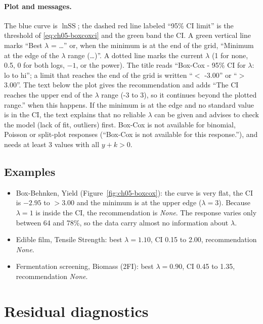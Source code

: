 \paragraph{Plot and messages.} The blue curve is $\ln\text{SS}$; the dashed red line labeled ``95\% CI
limit'' is the threshold of \eqref{eq:ch05-boxcoxci} and the green band the CI. A green vertical line marks
``Best $\lambda$ = \dots'' or, when the minimum is at the end of the grid, ``Minimum at the edge of the
$\lambda$ range (\dots)''. A dotted line marks the current $\lambda$ (1 for none, 0.5, 0 for both logs, $-1$,
or the power). The title reads ``Box-Cox - 95\% CI for $\lambda$: lo to hi''; a limit that reaches the end of
the grid is written ``$<$ -3.00'' or ``$>$ 3.00''. The text below the plot gives the recommendation and adds
``The CI reaches the upper end of the $\lambda$ range (-3 to 3), so it continues beyond the plotted range.''
when this happens. If the minimum is at the edge and no standard value is in the CI, the text explains that
no reliable $\lambda$ can be given and advises to check the model (lack of fit, outliers) first. Box-Cox is
not available for binomial, Poisson or split-plot responses (``Box-Cox is not available for this
response.''), and needs at least 3 values with all $y+k>0$.

\subsection*{Examples}
\begin{itemize}
  \item Box-Behnken, Yield (Figure~\ref{fig:ch05-boxcox}): the curve is very flat, the CI is $-2.95$ to
        $>3.00$ and the minimum is at the upper edge ($\lambda=3$). Because $\lambda=1$ is inside the CI,
        the recommendation is \emph{None}. The response varies only between 64 and 78\%, so the data carry
        almost no information about $\lambda$.
  \item Edible film, Tensile Strength: best $\lambda=1.10$, CI 0.15 to 2.00, recommendation \emph{None}.
  \item Fermentation screening, Biomass (2FI): best $\lambda=0.90$, CI 0.45 to 1.35, recommendation
        \emph{None}.
\end{itemize}

\section{Residual diagnostics}\label{sec:ch05-diag}

